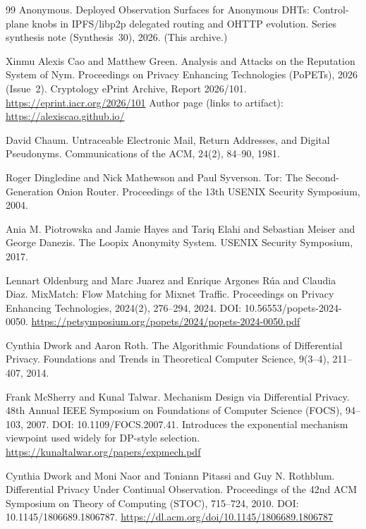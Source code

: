 \documentclass[11pt]{article}
\begin{document}
\begin{thebibliography}{99}
Anonymous.
\newblock Deployed Observation Surfaces for Anonymous DHTs: Control-plane knobs in IPFS/libp2p delegated routing and OHTTP evolution.
\newblock Series synthesis note (Synthesis~30), 2026. (This archive.)

Xinmu Alexis Cao and Matthew Green.
\newblock Analysis and Attacks on the Reputation System of {Nym}.
\newblock Proceedings on Privacy Enhancing Technologies (PoPETs), 2026 (Issue~2).
\newblock Cryptology ePrint Archive, Report 2026/101.
\newblock \url{https://eprint.iacr.org/2026/101}
\newblock Author page (links to artifact): \url{https://alexiscao.github.io/}

David Chaum.
\newblock Untraceable Electronic Mail, Return Addresses, and Digital Pseudonyms.
\newblock Communications of the ACM, 24(2), 84--90, 1981.

Roger Dingledine and Nick Mathewson and Paul Syverson.
\newblock Tor: The Second-Generation Onion Router.
\newblock Proceedings of the 13th USENIX Security Symposium, 2004.

Ania M. Piotrowska and Jamie Hayes and Tariq Elahi and Sebastian Meiser and George Danezis.
\newblock The {L}oopix Anonymity System.
\newblock USENIX Security Symposium, 2017.

Lennart Oldenburg and Marc Juarez and Enrique Argones R{\'u}a and Claudia Diaz.
\newblock MixMatch: Flow Matching for Mixnet Traffic.
\newblock Proceedings on Privacy Enhancing Technologies, 2024(2), 276--294, 2024.
\newblock DOI: 10.56553/popets-2024-0050.
\newblock \url{https://petsymposium.org/popets/2024/popets-2024-0050.pdf}

Cynthia Dwork and Aaron Roth.
\newblock The Algorithmic Foundations of Differential Privacy.
\newblock Foundations and Trends in Theoretical Computer Science, 9(3--4), 211--407, 2014.

Frank McSherry and Kunal Talwar.
\newblock Mechanism Design via Differential Privacy.
\newblock 48th Annual {IEEE} Symposium on Foundations of Computer Science (FOCS), 94--103, 2007.
\newblock DOI: 10.1109/FOCS.2007.41.
\newblock Introduces the exponential mechanism viewpoint used widely for DP-style selection.
\newblock \url{https://kunaltalwar.org/papers/expmech.pdf}

Cynthia Dwork and Moni Naor and Toniann Pitassi and Guy N. Rothblum.
\newblock Differential Privacy Under Continual Observation.
\newblock Proceedings of the 42nd {ACM} Symposium on Theory of Computing (STOC), 715--724, 2010.
\newblock DOI: 10.1145/1806689.1806787.
\newblock \url{https://dl.acm.org/doi/10.1145/1806689.1806787}


\end{thebibliography}
\end{document}

